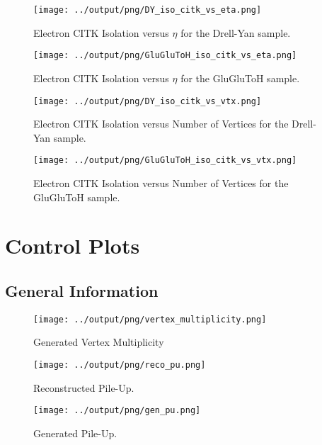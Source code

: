 \documentclass[11pt]{book}
\begin{document}
\begin{figure}[htb]
\centering
\texttt{[image: ../output/png/DY\_iso\_citk\_vs\_eta.png]}
\caption{Electron CITK Isolation versus $\eta$ for the Drell-Yan sample.}
\label{fig:dy_iso_citk_vs_eta}
\end{figure}

\begin{figure}[htb]
\centering
\texttt{[image: ../output/png/GluGluToH\_iso\_citk\_vs\_eta.png]}
\caption{Electron CITK Isolation versus $\eta$ for the GluGluToH sample.}
\label{fig:ggh_iso_citk_vs_eta}
\end{figure}

\begin{figure}[htb]
\centering
\texttt{[image: ../output/png/DY\_iso\_citk\_vs\_vtx.png]}
\caption{Electron CITK Isolation versus Number of Vertices for the Drell-Yan sample.}
\label{fig:dy_iso_citk_vs_vtx}
\end{figure}

\begin{figure}[htb]
\centering
\texttt{[image: ../output/png/GluGluToH\_iso\_citk\_vs\_vtx.png]}
\caption{Electron CITK Isolation versus Number of Vertices for the GluGluToH sample.}
\label{fig:ggh_iso_citk_vs_vtx}
\end{figure}
\clearpage

\chapter{Control Plots}
\section{General Information}
\begin{figure}[htb]
\centering
\texttt{[image: ../output/png/vertex\_multiplicity.png]}
\caption{Generated Vertex Multiplicity}
\label{fig:vertex_multiplicity}
\end{figure}

\begin{figure}[htb]
\centering
\texttt{[image: ../output/png/reco\_pu.png]}
\caption{Reconstructed Pile-Up.}
\label{fig:reco_gen_pu}
\end{figure}

\begin{figure}[htb]
\centering
\texttt{[image: ../output/png/gen\_pu.png]}
\caption{Generated Pile-Up.}
\label{fig:reco_gen_pu}
\end{figure}
\end{document}

